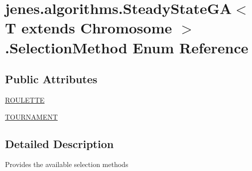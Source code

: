 \hypertarget{enumjenes_1_1algorithms_1_1_steady_state_g_a_3_01_t_01extends_01_chromosome_01_4_1_1_selection_method}{\section{jenes.\-algorithms.\-Steady\-State\-G\-A$<$ T extends Chromosome $>$.Selection\-Method Enum Reference}
\label{enumjenes_1_1algorithms_1_1_steady_state_g_a_3_01_t_01extends_01_chromosome_01_4_1_1_selection_method}
}
\subsection*{Public Attributes}
\begin{DoxyCompactItemize}
\item 
\hyperlink{enumjenes_1_1algorithms_1_1_steady_state_g_a_3_01_t_01extends_01_chromosome_01_4_1_1_selection_method_aea587ece8e60bb24368258652b8193cc}{R\-O\-U\-L\-E\-T\-T\-E}
\item 
\hyperlink{enumjenes_1_1algorithms_1_1_steady_state_g_a_3_01_t_01extends_01_chromosome_01_4_1_1_selection_method_a1cd629bf261d758c615ea8435fd4788f}{T\-O\-U\-R\-N\-A\-M\-E\-N\-T}
\end{DoxyCompactItemize}


\subsection{Detailed Description}
Provides the available selection methods 


